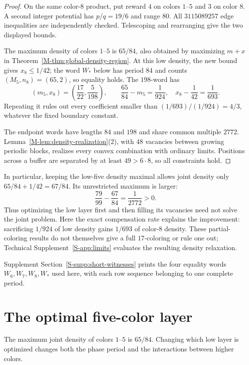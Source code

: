 \documentclass[11pt,reqno]{amsart}
\theoremstyle{plain}
\theoremstyle{plain}
\theoremstyle{plain}
\begin{document}
\begin{proof}
On the same color-$8$ product, put reward $4$ on colors $1$--$5$ and $3$
on color $8$. A second integer potential has $p/q=19/6$ and range $80$.
All $3115089257$ edge inequalities are independently checked. Telescoping
and rearranging give the two displayed bounds.

The maximum density of colors $1$--$5$ is $65/84$, also obtained by
maximizing $m+x$ in Theorem~\ref{M-thm:global-density-region}.
At this low density, the new bound gives $x_8\le1/42$; the word $W_*$
below has period $84$ and counts $(M_5,n_8)=(65,2)$, so equality holds.
The $198$-word has
\[
 (m_5,x_8)=\left(\frac{17}{22},\frac5{198}\right),\qquad
 \frac{65}{84}-m_5=\frac1{924},\quad
 x_8-\frac1{42}=\frac1{693}.
\]
Repeating it rules out every coefficient smaller than
$(1/693)/(1/924)=4/3$, whatever the fixed boundary constant.

The endpoint words have lengths $84$ and $198$ and share common
multiple $2772$. Lemma~\ref{M-lem:density-realization}(2), with $48$
vacancies between growing periodic blocks, realizes every convex
combination with ordinary limits. Positions across a buffer are
separated by at least $49>6\cdot8$, so all constraints hold.
\end{proof}

In particular, keeping the low-five density maximal allows joint density
only $65/84+1/42=67/84$. Its unrestricted maximum is larger:
\[
 \frac{79}{99}-\frac{67}{84}=\frac1{2772}>0.
\]
Thus optimizing the low layer first and then filling its vacancies need
not solve the joint problem. Here the exact compensation rate explains
the improvement: sacrificing $1/924$ of low density gains $1/693$ of
color-$8$ density. These partial-coloring results do not themselves give
a full $17$-coloring or rule one out; Technical Supplement~\ref*{S-app:limits} evaluates the resulting
density relaxation.

Supplement Section~\ref*{S-supp:short-witnesses} prints the four
equality words $W_6,W_7,W_8,W_*$ used here, with each row sequence
belonging to one complete period.

\section{The optimal five-color layer}
\label{M-sec:base-five-layer}

The maximum joint density of colors $1$--$5$ is $65/84$. Changing
which low layer is optimized changes both the phase period and the
interactions between higher colors.
\end{document}
